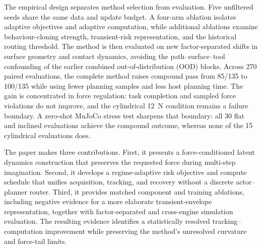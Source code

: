 The empirical design separates method selection from evaluation. Five
unfiltered seeds share the same data and update budget. A four-arm ablation
isolates adaptive objectives and adaptive computation, while additional
ablations examine behaviour-cloning strength, transient-risk representation,
and the historical routing threshold. The method is then evaluated on new
factor-separated shifts in surface geometry and contact dynamics, avoiding
the path--surface--tool confounding of the earlier combined
out-of-distribution (OOD) blocks. Across 270 paired evaluations, the complete
method raises compound pass from 85/135 to
100/135 while using fewer planning samples and less host planning time. The
gain is concentrated in force regulation: task completion and sampled force
violations do not improve, and the cylindrical 12~N condition remains a
failure boundary. A zero-shot MuJoCo stress test sharpens that boundary: all
30 flat and inclined evaluations achieve the compound outcome, whereas none of
the 15 cylindrical evaluations does.

The paper makes three contributions. First, it presents a force-conditioned
latent dynamics construction that preserves the requested force during
multi-step imagination. Second, it develops a regime-adaptive risk objective
and compute schedule that unifies acquisition, tracking, and recovery without
a discrete actor--planner router. Third, it provides matched component and
training ablations, including negative evidence for a more elaborate
transient-envelope representation, together with factor-separated and
cross-engine simulation evaluation. The resulting evidence identifies a
statistically resolved tracking--computation improvement while preserving the
method's unresolved curvature and force-tail limits.
